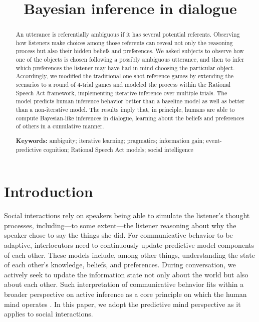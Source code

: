 \documentclass[10pt,a4paper]{article}
\title{Bayesian inference in dialogue}
\begin{document}
\maketitle

\begin{abstract}
	
An utterance is referentially ambiguous if it has several potential referents.
Observing how listeners make choices among those referents can reveal not only the reasoning process but also their hidden beliefs and preferences.
We asked subjects to observe how one of the objects is chosen following a possibly ambiguous utterance, and then to infer which preferences the listener may have had in mind choosing the particular object.
Accordingly, we modified the traditional one-shot reference games by extending the scenarios to a round of 4-trial games and modeled the process within the Rational Speech Act framework, implementing iterative inference over multiple trials.
The model predicts human inference behavior better than a baseline model as well as better than a non-iterative model. 
The results imply that, in principle, humans are able to compute Bayesian-like inferences in dialogue, learning about the beliefs and preferences of others in a cumulative manner.
                                                     

\textbf{Keywords:} 
ambiguity; iterative learning; pragmatics; information gain; event-predictive cognition; Rational Speech Act models; social intelligence
\end{abstract}


\section{Introduction}

Social interactions rely on speakers being able to simulate the listener's thought processes, including---to some extent---the listener reasoning about why the speaker chose to say the things she did.
For communicative behavior to be adaptive, interlocutors need to continuously update predictive model components of each other.
These models include, among other things, understanding the state of each other's knowledge, beliefs, and preferences.
During conversation, we actively seek to update the information state not only about the world but also about each other.
Such interpretation of communicative behavior fits within a broader perspective on active inference as a core principle on which the human mind operates \cite{Friston:2015b}.
In this paper, we adopt the predictive mind perspective as it applies to social interactions.
\end{document}
